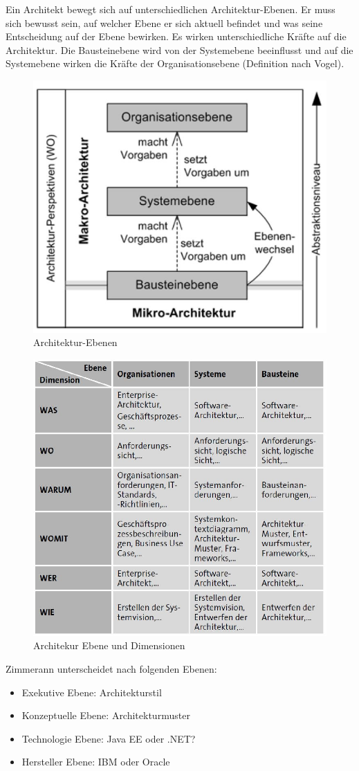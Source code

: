 Ein Architekt bewegt sich auf unterschiedlichen Architektur-Ebenen. Er muss sich bewusst sein, auf welcher Ebene er sich aktuell befindet und was seine Entscheidung auf der Ebene bewirken. Es wirken unterschiedliche Kräfte auf die Architektur. Die Bausteinebene wird von der Systemebene beeinflusst und auf die Systemebene wirken die Kräfte der Organisationsebene (Definition nach Vogel).

\begin{figure}[h!]
\centering
\includegraphics[width=0.5\linewidth]{fig/architekur-ebenen}
\caption{Architektur-Ebenen}
\label{fig:architekur-ebenen}
\end{figure}

\begin{figure}[h!]
\centering
\includegraphics[width=0.5\linewidth]{fig/architekur-ebenen-und-dimensionen}
\caption{Architekur Ebene und Dimensionen}
\label{fig:architekur-ebenen-und-dimensionen}
\end{figure}

\newpage

Zimmerann unterscheidet nach folgenden Ebenen:
\begin{itemize}
	\item Exekutive Ebene: Architekturstil
	\item Konzeptuelle Ebene: Architekturmuster
	\item Technologie Ebene: Java EE oder .NET?
	\item Hersteller Ebene: IBM oder Oracle
\end{itemize}

